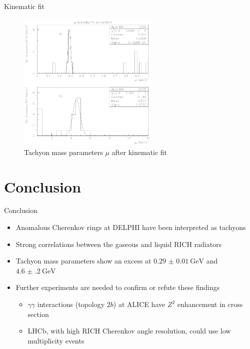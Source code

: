 \documentclass{beamer}
\begin{document}
\begin{frame}{Kinematic fit}
  \begin{figure}
    \centering
    \includegraphics[width = 0.6\textwidth]{ConstrainedMassParameters.png}
    \caption{Tachyon mass parameters $\mu$ after kinematic fit}
  \end{figure}
\end{frame}

\section{Conclusion}
\begin{frame}{Conclusion}
  \begin{itemize}
    \item{Anomalous Cherenkov rings at DELPHI have been interpreted as tachyons}
    \item{Strong correlations between the gaseous and liquid RICH radiators}
    \item{Tachyon mass parameters show an excess at $\SI{0.29(1)}{\giga\eV}$ and $\SI{4.6(2)}{\giga\eV}$}
    \item{Further experiments are needed to confirm or refute these findings}
    \begin{itemize}
      \item{$\gamma\gamma$ interactions (topology $2b$) at ALICE have $Z^2$ enhancement in cross section}
      \item{LHCb, with high RICH Cherenkov angle resolution, could use low multiplicity events}
    \end{itemize}
  \end{itemize}
\end{frame}
\end{document}
